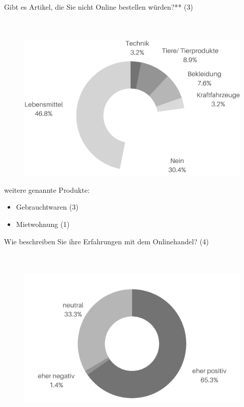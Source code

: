 \newpage\noindent Gibt es Artikel, die Sie nicht Online bestellen würden?** (3)\\\\\\
\begin{figure}[H]
    \begin{center}
        \includegraphics[width=11.5cm]{media/schuelerumfrage/3.png}
    \end{center}
\end{figure}
\vfill
\noindent weitere genannte Produkte:
\begin{itemize}
 \item Gebrauchtwaren (3)
 \item Mietwohnung (1)
\end{itemize}
\vfill\vfill\vfill\vfill 



\newpage\noindent Wie beschreiben Sie ihre Erfahrungen mit dem Onlinehandel? (4)\\\\\\
\begin{figure}[H]
    \begin{center}
        \includegraphics[width=11.5cm]{media/schuelerumfrage/4.png}
    \end{center}
\end{figure}



